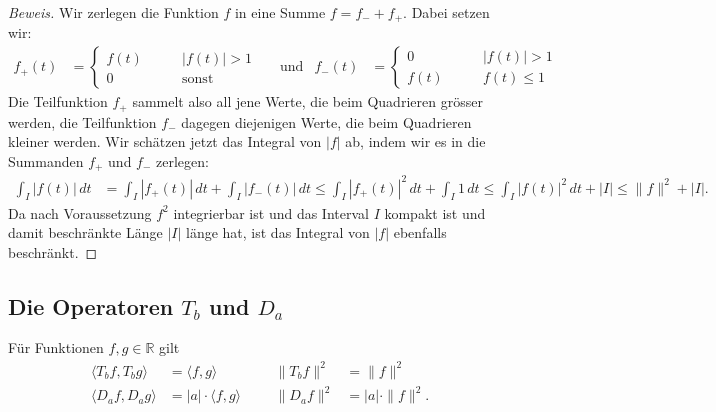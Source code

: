 \begin{proof}[Beweis]
Wir zerlegen die Funktion $f$ in eine Summe $f=f_-+f_+$. 
Dabei setzen wir:
\begin{align*}
f_+(t) &= 
\begin{cases}
f(t)&\qquad |f(t)| > 1\\
0   &\qquad\text{sonst}
\end{cases}
&&\text{und}
&
f_-(t)
&=
\begin{cases}
0   &\qquad |f(t)| > 1\\
f(t)&\qquad f(t)\le 1
\end{cases}
\end{align*}
Die Teilfunktion $f_+$ sammelt also all jene Werte, die beim Quadrieren
grösser werden, die Teilfunktion $f_-$ dagegen diejenigen Werte, die
beim Quadrieren kleiner werden.
Wir schätzen jetzt das Integral von $|f|$ ab, indem wir es in die Summanden
$f_+$ und $f_-$ zerlegen:
\begin{align*}
\int_I |f(t)|\,dt
&=
\int_I |f_+(t)|\,dt + \int_I |f_-(t)|\,dt
\le
\int_I |f_+(t)|^2\,dt + \int_I 1\,dt
\le 
\int_I |f(t)|^2\,dt + |I|
\le \|f\|^2 + |I|.
\end{align*}
Da nach Voraussetzung $f^2$ integrierbar ist und das Interval $I$ kompakt ist
und damit beschränkte Länge $|I|$ länge hat, ist das Integral von $|f|$
ebenfalls beschränkt.
\end{proof}

\subsection{Die Operatoren $T_b$ und $D_a$}

\begin{satz}
Für Funktionen $f,g\in\mathbb R$ gilt
\[
\begin{aligned}
\langle T_bf,T_bg\rangle
&=
\langle f,g\rangle
&&
&
\| T_bf\|^2 &= \|f\|^2
\\
\langle D_af,D_ag\rangle
&=
|a|\cdot
\langle f,g\rangle
&&
&
\| D_af\|^2 &= |a|\cdot \|f\|^2.
\end{aligned}
\]
\end{satz}

